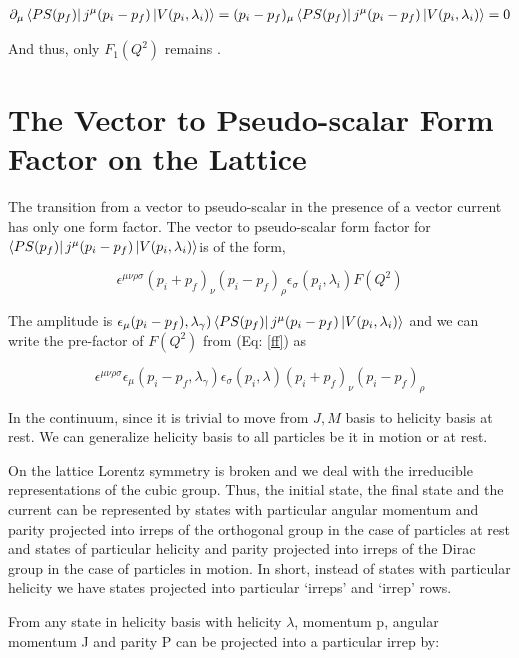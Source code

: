 \documentclass[10pt]{article}
\begin{document}
\begin{align*}
\partial_{\mu}\bra{PS(p_f)} j^{\mu}(p_i - p_f)\ket{V(p_i, \lambda_i)} = (p_i - p_f)_{\mu}\bra{PS(p_f)} j^{\mu}(p_i - p_f)\ket{V(p_i, \lambda_i)} = 0
\end{align*}

And thus, only $F_1(Q^2)$ remains \cite{shultz}.





\section{The Vector to Pseudo-scalar Form Factor on the Lattice } 
The transition from a vector to pseudo-scalar in the presence of a vector current has only one form factor.
The vector to pseudo-scalar form factor for $\bra{PS(p_f)} j^{\mu}(p_i - p_f)\ket{V(p_i, \lambda_i)}$is of the form,

\begin{equation}
\label{ff}
\epsilon^{\mu\nu\rho\sigma}(p_i + p_f)_{\nu}(p_i - p_f)_{\rho}\epsilon_{\sigma}(p_i, \lambda_i)F(Q^{2})
\end{equation}

\par
The amplitude is $\epsilon_{\mu}(p_i - p_f), \lambda_{\gamma})\bra{PS(p_f)} j^{\mu}(p_i - p_f)\ket{V(p_i, \lambda_i)}$ and we can write the pre-factor of  $F(Q^2)$ from (Eq: \ref{ff}) as

\begin{equation}
\label{amp}
\epsilon^{\mu\nu\rho\sigma}\epsilon_{\mu}(p_i - p_f, \lambda_{\gamma})\epsilon_{\sigma}(p_i, \lambda)(p_i + p_f)_{\nu}(p_i - p_f)_{\rho}
\end{equation}

\par
In the continuum, since it is trivial to move from $J,M$ basis to helicity basis at rest. We can generalize helicity basis to all particles be it in motion or at rest. \par
On the lattice Lorentz symmetry is broken and we deal with the irreducible representations of the cubic group. Thus, the initial state, the final state and the current can be represented by states with particular angular momentum and parity projected into irreps of the orthogonal group in the case of particles at rest and states of particular helicity and parity projected into irreps of the Dirac group in the case of particles in motion. In short, instead of states with particular helicity we have states projected into particular `irreps' and `irrep' rows. \par 
From \cite{hel} any state in helicity basis with helicity $\lambda$, momentum p, angular momentum J and parity P can be projected into a particular irrep by:
\end{document}
